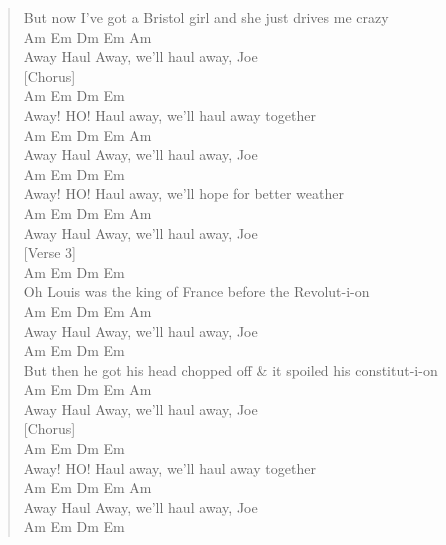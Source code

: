 \documentclass[11pt]{article}
\begin{document}
\begin{verse}
But now I've got a Bristol girl and she just drives me crazy\\
Am         Em         Dm   Em    Am\\
Away Haul Away, we'll haul away, Joe\\
\vspace*{1em}
\vspace*{1em}
[Chorus]\\
Am        Em              Dm          Em\\
Away! HO! Haul away, we'll haul away together\\
Am         Em         Dm   Em    Am\\
Away Haul Away, we'll haul away, Joe\\
Am        Em               Dm              Em\\
Away! HO! Haul away, we'll hope for better weather\\
Am         Em         Dm   Em    Am\\
Away Haul Away, we'll haul away, Joe\\
\vspace*{1em}
\vspace*{1em}
[Verse 3]\\
\hspace*{4em}Am           Em              Dm             Em\\
Oh Louis was the king of France before the Revolut-i-on\\
Am         Em         Dm   Em    Am\\
Away Haul Away, we'll haul away, Joe\\
\hspace*{4em}Am              Em                    Dm                Em\\
But then he got his head chopped off \& it spoiled his constitut-i-on\\
Am         Em         Dm   Em    Am\\
Away Haul Away, we'll haul away, Joe\\
\vspace*{1em}
\vspace*{1em}
[Chorus]\\
Am        Em              Dm          Em\\
Away! HO! Haul away, we'll haul away together\\
Am         Em         Dm   Em    Am\\
Away Haul Away, we'll haul away, Joe\\
Am        Em               Dm              Em\\

\end{verse}
\end{document}
